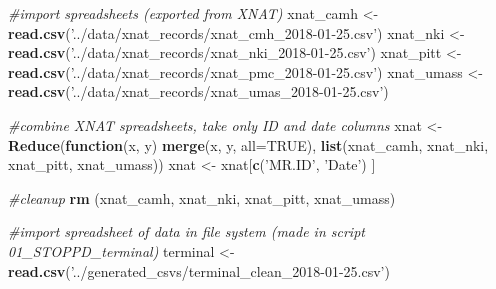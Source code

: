 \documentclass[]{article}
\newenvironment{Shaded}{\begin{snugshade}}{\end{snugshade}}
\newcommand{\KeywordTok}[1]{\textcolor[rgb]{0.13,0.29,0.53}{\textbf{#1}}}
\newcommand{\DataTypeTok}[1]{\textcolor[rgb]{0.13,0.29,0.53}{#1}}
\newcommand{\StringTok}[1]{\textcolor[rgb]{0.31,0.60,0.02}{#1}}
\newcommand{\CommentTok}[1]{\textcolor[rgb]{0.56,0.35,0.01}{\textit{#1}}}
\newcommand{\OtherTok}[1]{\textcolor[rgb]{0.56,0.35,0.01}{#1}}
\newcommand{\ControlFlowTok}[1]{\textcolor[rgb]{0.13,0.29,0.53}{\textbf{#1}}}
\newcommand{\NormalTok}[1]{#1}
\theoremstyle{definition}
\theoremstyle{definition}
\theoremstyle{definition}
\theoremstyle{remark}
\begin{document}
\begin{Shaded}
\begin{Highlighting}[]
\CommentTok{#import spreadsheets (exported from XNAT)}
\NormalTok{xnat_camh <-}\StringTok{ }\KeywordTok{read.csv}\NormalTok{(}\StringTok{'../data/xnat_records/xnat_cmh_2018-01-25.csv'}\NormalTok{)}
\NormalTok{xnat_nki <-}\StringTok{ }\KeywordTok{read.csv}\NormalTok{(}\StringTok{'../data/xnat_records/xnat_nki_2018-01-25.csv'}\NormalTok{)}
\NormalTok{xnat_pitt <-}\StringTok{ }\KeywordTok{read.csv}\NormalTok{(}\StringTok{'../data/xnat_records/xnat_pmc_2018-01-25.csv'}\NormalTok{)}
\NormalTok{xnat_umass <-}\StringTok{ }\KeywordTok{read.csv}\NormalTok{(}\StringTok{'../data/xnat_records/xnat_umas_2018-01-25.csv'}\NormalTok{)}

\CommentTok{#combine XNAT spreadsheets, take only ID and date columns}
\NormalTok{xnat <-}\StringTok{ }\KeywordTok{Reduce}\NormalTok{(}\ControlFlowTok{function}\NormalTok{(x, y) }\KeywordTok{merge}\NormalTok{(x, y, }\DataTypeTok{all=}\OtherTok{TRUE}\NormalTok{), }\KeywordTok{list}\NormalTok{(xnat_camh, xnat_nki, xnat_pitt, xnat_umass))}
\NormalTok{xnat <-}\StringTok{ }\NormalTok{xnat[}\KeywordTok{c}\NormalTok{(}\StringTok{'MR.ID'}\NormalTok{, }\StringTok{'Date'}\NormalTok{) ]}

\CommentTok{#cleanup}
\KeywordTok{rm}\NormalTok{ (xnat_camh, xnat_nki, xnat_pitt, xnat_umass)}

\CommentTok{#import spreadsheet of data in file system (made in script 01_STOPPD_terminal)}
\NormalTok{terminal <-}\StringTok{ }\KeywordTok{read.csv}\NormalTok{(}\StringTok{'../generated_csvs/terminal_clean_2018-01-25.csv'}\NormalTok{)}
\end{Highlighting}
\end{Shaded}
\end{document}

